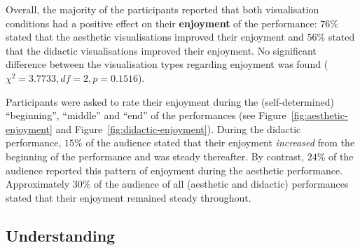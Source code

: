 Overall, the majority of the participants reported that both visualisation conditions had a positive effect on their \textbf{enjoyment} of the performance: $76\%$ stated that the aesthetic visualisations improved their enjoyment and $56\%$ stated that the didactic visualisations improved their enjoyment. No significant difference between the visualisation types regarding  enjoyment was found ($\chi^2=3.7733,df=2,p=0.1516$).

Participants were asked to rate their enjoyment during the (self-determined) ``beginning'', ``middle'' and ``end'' of the performances (see Figure~\ref{fig:aesthetic-enjoyment} and Figure~\ref{fig:didactic-enjoyment}). During the didactic performance, $15\%$ of the audience stated that their enjoyment \emph{increased} from the beginning of the performance and was steady thereafter. By contrast, $24\%$ of the audience reported this pattern of enjoyment during the aesthetic performance. Approximately $30\%$ of the audience of all (aesthetic and didactic) performances stated that their enjoyment remained steady throughout.

\subsection{Understanding}

